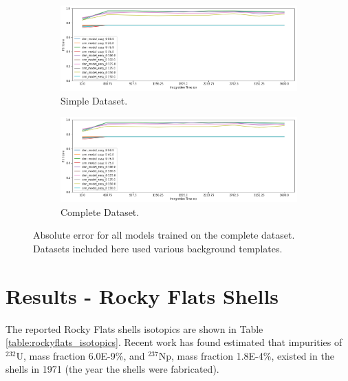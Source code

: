 \begin{figure}[H]
     \centering
     \begin{subfigure}[b]{0.9\textwidth}
         \centering
         \includegraphics[width=\textwidth]{images/results_easy_distance_comparison}
         \caption{Simple Dataset.}
         \label{fig:results_full_background_inject_simple}
     \end{subfigure}

     \begin{subfigure}[b]{0.9\textwidth}
         \centering
         \includegraphics[width=\textwidth]{images/results_easy_distance_comparison}
         \caption{Complete Dataset.}
         \label{fig:results_full_background_inject_full}
     \end{subfigure}
        \caption{Absolute error for all models trained on the complete dataset. Datasets included here used various background templates.}
        \label{fig:results_full_background_inject}
\end{figure}




\section{Results - Rocky Flats Shells}



The reported Rocky Flats shells isotopics are shown in Table \ref{table:rockyflats_isotopics}. Recent work has found estimated that impurities of $^{232}$U, mass fraction 6.0E-9\%, and $^{237}$Np, mass fraction 1.8E-4\%, \cite{RawoolSullivan2012} existed in the shells in 1971 (the year the shells were fabricated).

